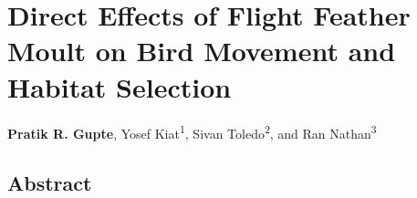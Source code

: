 \chapter{Direct Effects of Flight Feather Moult on Bird Movement and Habitat Selection}\label{ch:holeybirds}

{\noindent \textbf{Pratik R. Gupte}, Yosef Kiat\textsuperscript{1}, Sivan Toledo\textsuperscript{2}, and Ran Nathan\textsuperscript{3}}


\section*{Abstract}


